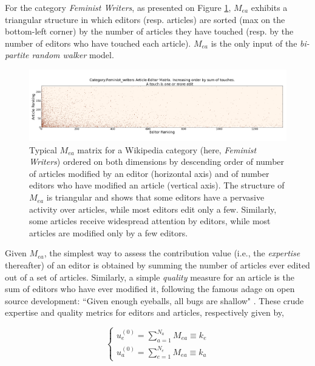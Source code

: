 For the category {\it Feminist Writers}, as presented on Figure \ref{fig:triangle}, $M_{ea}$ exhibits a triangular structure in which editors (resp. articles) are sorted (max on the bottom-left corner) by the number of articles they have touched (resp. by the number of editors who have touched each article). $M_{ea}$ is the only input of the {\it bi-partite random walker} model.
\begin{figure}[!t]
\centering
\includegraphics[width=2.0\columnwidth]{../Figures/Category_Feminist_writerstriangle_matrix_corrected.png}
\caption{Typical $\mathbf{\mathit{M_{ea}}}$ matrix for a Wikipedia category (here, {\it Feminist Writers}) ordered on both dimensions by descending order of number of articles modified by an editor (horizontal axis) and of number editors who have modified an article (vertical axis). The structure of $\mathbf{\mathit{M_{ea}}}$ is triangular and shows that some editors have a pervasive activity over articles, while most editors edit only a few. Similarly, some articles receive widespread attention by editors, while most articles are modified only by a few editors.}
\label{fig:triangle}
\end{figure}


Given $M_{ea}$, the simplest way to assess the contribution value (i.e., the {\it expertise} thereafter) of an editor is obtained by summing the number of articles ever edited out of a set of articles. Similarly, a simple {\it quality} measure for an article is the sum of editors who have ever modified it, following the famous adage on open source development: ``Given enough eyeballs, all bugs are shallow" \cite{raymond1999}. These crude expertise and quality metrics for editors and articles, respectively  given by,

\begin{equation}
\begin{cases}
 u_{e}^{(0)} = \sum_{a=1}^{N_{a}} M_{ea} \equiv k_e\\[7pt]
 u_{a}^{(0)} = \sum_{e=1}^{N_{e}} M_{ea} \equiv k_a
\end{cases}
\label{HHinit}
\end{equation}


